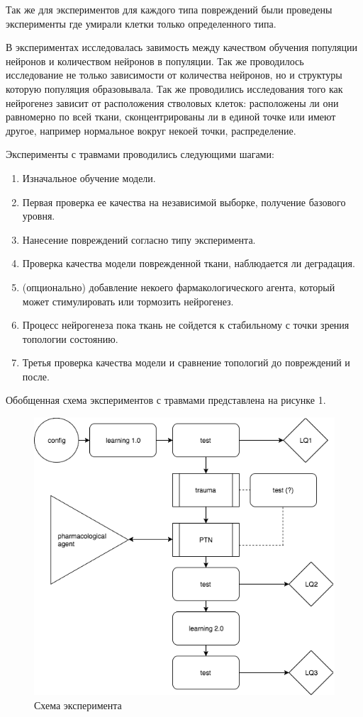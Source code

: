 \documentclass{spbau-diploma}
\begin{document}
Так же для экспериментов для каждого типа повреждений были проведены эксперименты где умирали клетки только определенного типа.

В экспериментах исследовалась завимость между качеством обучения популяции нейронов и количеством нейронов в популяции. Так же проводилось исследование не только зависимости от количества нейронов, но и структуры которую популяция образовывала. Так же проводились исследования того как нейрогенез зависит от расположения стволовых клеток: расположены ли они равномерно по всей ткани, сконцентрированы ли в единой точке или имеют другое, например нормальное вокруг некоей точки, распределение.

Эксперименты с травмами проводились следующими шагами:

\begin{enumerate}
    \item Изначальное обучение модели.
    \item Первая проверка ее качества на независимой выборке, получение базового уровня.
    \item Нанесение повреждений согласно типу эксперимента.
    \item Проверка качества модели поврежденной ткани, наблюдается ли деградация.
    \item (опционально) добавление некоего фармакологического агента, который может стимулировать или тормозить нейрогенез.
    \item Процесс нейрогенеза пока ткань не сойдется к стабильному с точки зрения топологии состоянию.
    \item Третья проверка качества модели и сравнение топологий до повреждений и после.
\end{enumerate}

Обобщенная схема экспериментов с травмами представлена на рисунке 1.

\begin{figure}[h]
\centering
\includegraphics[scale=0.5]{images/testing_scheme.png}
\caption{Схема эксперимента}
\label{testing_scheme}
\end{figure}
\end{document}
